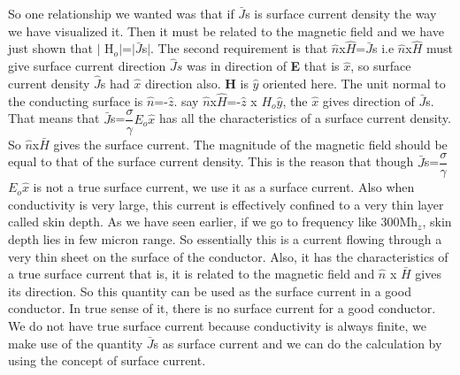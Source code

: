 So one relationship we wanted was that if $\bar{J}$s is surface current density the way we have visualized it. Then it must be related to the magnetic field and we have just shown that $\lvert$ H$_{o}$$\rvert$=$\rvert$$\bar{J}$s$\rvert$. The second requirement is that $\hat{n}$x$\hat{H}$=$\bar{J}$s i.e $\hat{n}$x$\hat{H}$  must give surface current direction $\hat{J}s$ was in direction of \textbf{E} that is $\hat{x}$, so surface current density $\hat{J}$s had $\hat{x}$ direction also. \textbf{H} is $\hat{y}$ oriented here. The unit normal to the conducting surface is $\hat{n}$=-$\hat{z}$. say $\hat{n}$x$\hat{H}$=-$\hat{z}$ x $H_{o}$$\hat{y}$, the $\hat{x}$ gives direction of $\bar{J}$s. That means that $\bar{J}$s=$\dfrac{\sigma}{\gamma}$$E_{o}$$\hat{x}$ has all the characteristics of a surface current density. So $\hat{n}$x$\bar{H}$ gives the surface current. The magnitude of the magnetic field should be equal to that of the surface current density. This is the reason that though $\bar{J}$s=$\dfrac{\sigma}{\gamma}$$E_{o}$$\hat{x}$ is not a true surface current, we use it as a surface current. Also when conductivity is very large, this current is effectively confined to a very thin layer called skin depth. As we have seen earlier, if we go to frequency like 300Mh$_{z}$, skin depth lies in few micron range. So essentially this is a current flowing through a very thin sheet on the surface of the conductor. Also, it has the characteristics of a true surface current that is, it is related to the magnetic field and $\hat{n}$ x $\bar{H}$ gives its direction. So this quantity can be used as the surface current in a good conductor. In true sense of it, there is no surface current for a good conductor. We do not have true surface current because conductivity is always finite, we make use of the quantity $\bar{J}$s as surface current and we can do the calculation by using the concept of surface current.\\

